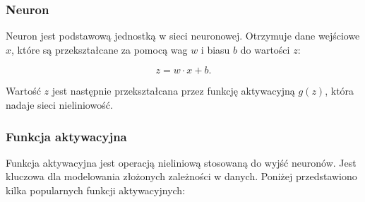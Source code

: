 \subsubsection{Neuron}

Neuron jest podstawową jednostką w sieci neuronowej. Otrzymuje dane wejściowe \(x\), które są przekształcane za pomocą wag \(w\) i biasu \(b\) do wartości \(z\):

\[
	z = w \cdot x + b.
\]

Wartość \(z\) jest następnie przekształcana przez funkcję aktywacyjną \(g(z)\), która nadaje sieci nieliniowość.

\subsubsection{Funkcja aktywacyjna}

Funkcja aktywacyjna jest operacją nieliniową stosowaną do wyjść neuronów. Jest kluczowa dla modelowania złożonych zależności w danych. Poniżej przedstawiono kilka popularnych funkcji aktywacyjnych:

